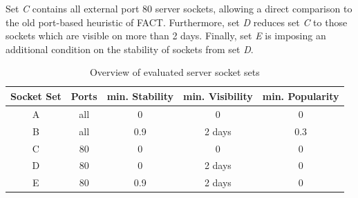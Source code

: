 Set \emph{C} contains all external port 80 \glspl{server socket}, allowing a direct comparison to the old port-based heuristic of \gls{FACT}. 
Furthermore, set \emph{D} reduces set \emph{C} to those sockets which are visible on more than 2 days. 
Finally, set \emph{E} is imposing an additional condition on the stability of sockets from set \emph{D}. 
\begin{table}
	[ht] \centering 
	\begin{tabular}
		{|c|c|c|c|c|} \hline \textbf{Socket Set} & \textbf{Ports} & \textbf{min. Stability} & \textbf{min. Visibility} & \textbf{min. Popularity} \\
		\hline \hline A & all & 0 & 0 & 0\\
		\hline B & all & 0.9 & 2 days & 0.3 \\
		\hline C & 80 & 0 & 0 & 0 \\
		\hline D & 80 & 0 & 2 days & 0 \\
		\hline E & 80 & 0.9 & 2 days & 0 \\
		\hline 
	\end{tabular}
	\caption{Overview of evaluated \gls{server socket} sets} 
	\label{tab:ses_sets} 
\end{table}

